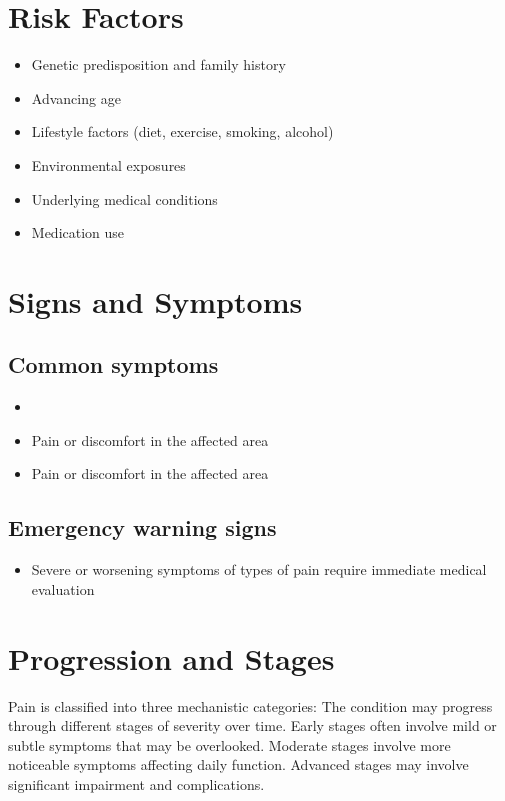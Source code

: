\section{Risk Factors}

\begin{itemize}[noitemsep]
  \item Genetic predisposition and family history
  \item Advancing age
  \item Lifestyle factors (diet, exercise, smoking, alcohol)
  \item Environmental exposures
  \item Underlying medical conditions
  \item Medication use
\end{itemize}
\section{Signs and Symptoms}

\subsection{Common symptoms}
\begin{itemize}[noitemsep]
  \item \item Pain or discomfort in the affected area    \item Pain or discomfort in the affected area
  \end{itemize}

\subsection{Emergency warning signs}
\begin{itemize}[noitemsep]
  \item Severe or worsening symptoms of types of pain require immediate medical evaluation
\end{itemize}
\section{Progression and Stages}
Pain is classified into three mechanistic categories: The condition may progress through different stages of severity over time. Early stages often involve mild or subtle symptoms that may be overlooked. Moderate stages involve more noticeable symptoms affecting daily function. Advanced stages may involve significant impairment and complications.
